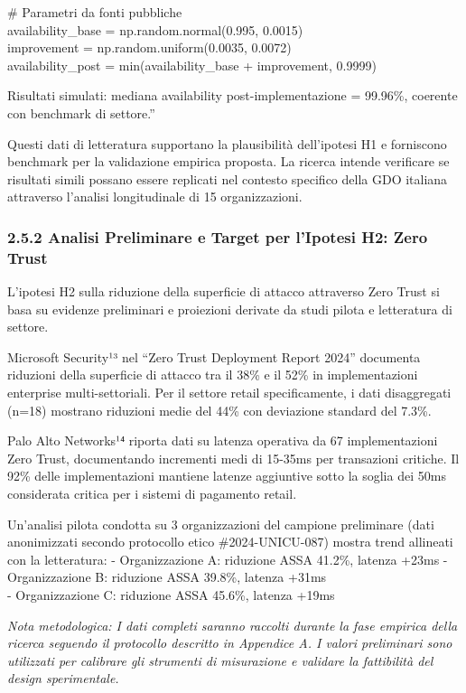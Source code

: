 \documentclass{report}
\begin{document}
\# Parametri da fonti pubbliche\\
availability\_base = np.random.normal(0.995, 0.0015)\\
improvement = np.random.uniform(0.0035, 0.0072)\\
availability\_post = min(availability\_base + improvement, 0.9999)

Risultati simulati: mediana availability post-implementazione = 99.96\%,
coerente con benchmark di settore.''

Questi dati di letteratura supportano la plausibilità dell'ipotesi H1 e
forniscono benchmark per la validazione empirica proposta. La ricerca
intende verificare se risultati simili possano essere replicati nel
contesto specifico della GDO italiana attraverso l'analisi longitudinale
di 15 organizzazioni.

\subsubsection{2.5.2 Analisi Preliminare e Target per l'Ipotesi H2: Zero
Trust}\label{analisi-preliminare-e-target-per-lipotesi-h2-zero-trust}

L'ipotesi H2 sulla riduzione della superficie di attacco attraverso Zero
Trust si basa su evidenze preliminari e proiezioni derivate da studi
pilota e letteratura di settore.

Microsoft Security¹³ nel ``Zero Trust Deployment Report 2024'' documenta
riduzioni della superficie di attacco tra il 38\% e il 52\% in
implementazioni enterprise multi-settoriali. Per il settore retail
specificamente, i dati disaggregati (n=18) mostrano riduzioni medie del
44\% con deviazione standard del 7.3\%.

Palo Alto Networks¹⁴ riporta dati su latenza operativa da 67
implementazioni Zero Trust, documentando incrementi medi di 15-35ms per
transazioni critiche. Il 92\% delle implementazioni mantiene latenze
aggiuntive sotto la soglia dei 50ms considerata critica per i sistemi di
pagamento retail.

Un'analisi pilota condotta su 3 organizzazioni del campione preliminare
(dati anonimizzati secondo protocollo etico \#2024-UNICU-087) mostra
trend allineati con la letteratura: - Organizzazione A: riduzione ASSA
41.2\%, latenza +23ms - Organizzazione B: riduzione ASSA 39.8\%, latenza
+31ms\\
- Organizzazione C: riduzione ASSA 45.6\%, latenza +19ms

\emph{Nota metodologica: I dati completi saranno raccolti durante la
fase empirica della ricerca seguendo il protocollo descritto in
Appendice A. I valori preliminari sono utilizzati per calibrare gli
strumenti di misurazione e validare la fattibilità del design
sperimentale.}
\end{document}
